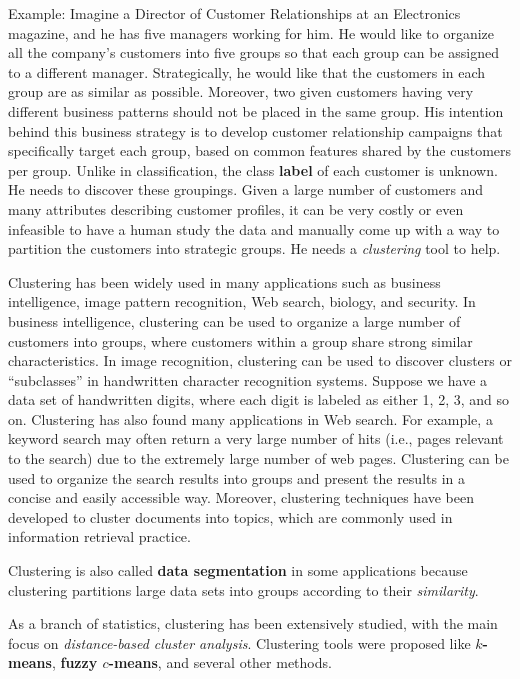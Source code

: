 \documentclass[]{book}
\theoremstyle{definition}
\theoremstyle{definition}
\theoremstyle{definition}
\theoremstyle{remark}
\begin{document}
Example: Imagine a Director of Customer Relationships at an Electronics
magazine, and he has five managers working for him. He would like to
organize all the company's customers into five groups so that each group
can be assigned to a different manager. Strategically, he would like
that the customers in each group are as similar as possible. Moreover,
two given customers having very different business patterns should not
be placed in the same group. His intention behind this business strategy
is to develop customer relationship campaigns that specifically target
each group, based on common features shared by the customers per group.
Unlike in classification, the class \textbf{label} of each customer is
unknown. He needs to discover these groupings. Given a large number of
customers and many attributes describing customer profiles, it can be
very costly or even infeasible to have a human study the data and
manually come up with a way to partition the customers into strategic
groups. He needs a \emph{clustering} tool to help.

Clustering has been widely used in many applications such as business
intelligence, image pattern recognition, Web search, biology, and
security. In business intelligence, clustering can be used to organize a
large number of customers into groups, where customers within a group
share strong similar characteristics. In image recognition, clustering
can be used to discover clusters or ``subclasses'' in handwritten
character recognition systems. Suppose we have a data set of handwritten
digits, where each digit is labeled as either 1, 2, 3, and so on.
Clustering has also found many applications in Web search. For example,
a keyword search may often return a very large number of hits (i.e.,
pages relevant to the search) due to the extremely large number of web
pages. Clustering can be used to organize the search results into groups
and present the results in a concise and easily accessible way.
Moreover, clustering techniques have been developed to cluster documents
into topics, which are commonly used in information retrieval practice.

Clustering is also called \textbf{data segmentation} in some
applications because clustering partitions large data sets into groups
according to their \emph{similarity}.

As a branch of statistics, clustering has been extensively studied, with
the main focus on \emph{distance-based cluster analysis}. Clustering
tools were proposed like \textbf{\(k\)-means}, \textbf{fuzzy
\(c\)-means}, and several other methods.
\end{document}
